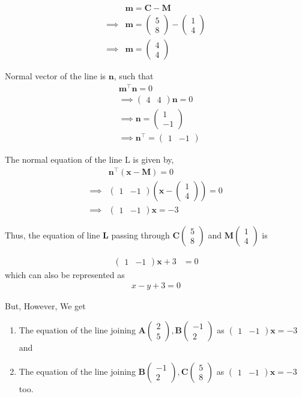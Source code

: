 \documentclass[journal,12pt,twocolumn]{IEEEtran}
\let\vec\mathbf
\newcommand{\myvec}[1]{\ensuremath{\begin{pmatrix}#1\end{pmatrix}}}
\providecommand{\brak}[1]{\ensuremath{\left(#1\right)}}
\begin{document}
    \begin{align}
        &\vec{m} = \vec{C} - \vec{M}\\
	    \implies &\vec{m} = \myvec{5 \\ 8} - \myvec{1 \\ 4}\\
	    \implies &\vec{m} = \myvec{4 \\ 4}
    \end{align}
    
    Normal vector of the line is $\vec{n}$, such that
    \begin{align}
	    &\vec{m}^{\top}\vec{n} = 0\\
	    &\implies \myvec{4 & 4}\vec{n} = 0\\
	    &\implies \vec{n} = \myvec{1 \\ -1}\\
	    &\implies \vec{n}^{\top} = \myvec{1 & -1}
    \end{align}
    
    The normal equation of the line L is given by, 
    \begin{align}
	    &\vec{n}^{\top}\brak{\vec{x} - \vec{M}} = 0\\
	    \implies &\myvec{1 & -1}\brak{\vec{x} - \myvec{1 \\ 4}}= 0\\
	    \implies &\myvec{1 & -1}\vec{x} = -3
    \end{align}
    
    Thus, the equation of line $\vec{L}$ passing through  $\vec{C}\myvec{5\\8}$ and $\vec{M}\myvec{1\\4}$ is 
        
    \begin{align}
          \myvec{1 & - 1}\vec{x} + 3 &= 0
    \end{align}
        which can also be represented as 
    \begin{align}
         x-y+3=0
    \end{align}
      
    {\large But, However,} We get
    \begin{enumerate}
         \item The equation of the line joining $\vec{A}\myvec{2\\5},     \vec{B}\myvec{-1\\2}$ as $\myvec{1 & - 1}\vec{x} = -3$ and 
             \newline
        \item The equation of the line joining $\vec{B}\myvec{-1\\2}, \vec{C}\myvec{5\\8}$ as $\myvec{1 & - 1}\vec{x}=-3$ too.\newline
    \end{enumerate}
    
\end{document}

